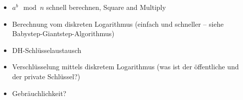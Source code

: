 \documentclass[
  a4paper,
  11pt,
]{article}
\begin{document}
\begin{itemize}
  \item $a^b \mod n$ schnell berechnen, Square and Multiply
  \item Berechnung vom diskreten Logarithmus (einfach und schneller – siehe
    Babystep-Giantstep-Algorithmus)
  \item DH-Schlüsselaustausch
  \item Verschlüsselung mittels diskretem Logarithmus (was ist der öffentliche
    und der private Schlüssel?)
  \item Gebräuchlichkeit?
\end{itemize}
\end{document}

